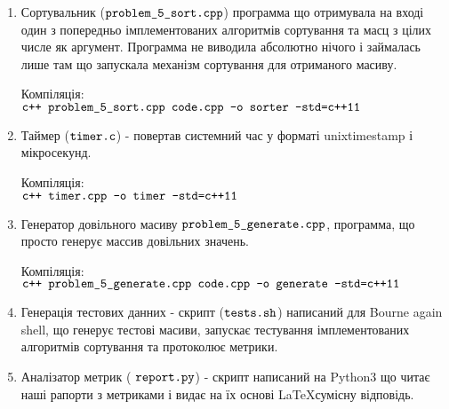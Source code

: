 \begin{center}
\end{center}

\begin{enumerate}
  \item Сортувальник ($\normalsize\texttt{problem\_5\_sort.cpp}$) программа що отримувала на вході один з попередньо імплементованих алгоритмів сортування та масц з цілих числе як аргумент. Программа не виводила абсолютно нічого і займалась лише там що запускала механізм сортування для отриманого масиву.

  Компіляція: \\
  $\normalsize\texttt{c++ problem\_5\_sort.cpp code.cpp -o sorter -std=c++11}$

  \item Таймер ($\normalsize\texttt{timer.c}$) - повертав системний час у форматі unixtimestamp і мікросекунд.

  Компіляція: \\
  $\normalsize\texttt{c++ timer.cpp -o timer -std=c++11}$

  \item Генератор довільного масиву $\normalsize\texttt{problem\_5\_generate.cpp}$, программа, що просто генерує массив довільних значень.

  Компіляція: \\
  $\normalsize\texttt{c++ problem\_5\_generate.cpp code.cpp -o generate -std=c++11}$

  \item Генерація тестових данних - скрипт  ($\normalsize\texttt{tests.sh}$) написаний для Bourne again shell, що генерує тестові масиви, запускає тестування імплементованих алгоритмів сортування та протоколює метрики.

  \item Аналізатор метрик (  $\normalsize\texttt{report.py}$) - скрипт написаний на Python3 що читає наші рапорти з метриками і видає на їх основі \LaTeX сумісну відповідь.
\end{enumerate}

\begin{center}
\end{center}

